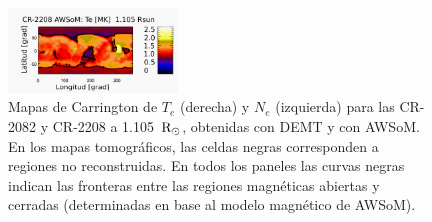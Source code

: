 \documentclass[baaa]{baaa}
\begin{document}
\begin{figure}[h!]
  \includegraphics[width=0.4\textwidth]{map_Te_awsom_2208_185_short_1105_Rsun_3.pdf}
  \caption{Mapas de Carrington de $T_e$ (derecha) y $N_e$ (izquierda) para las CR-2082 y CR-2208 a 1.105~${\rm 
  R_\odot}$, obtenidas con DEMT y con AWSoM. En los mapas tomográficos, las celdas negras corresponden a regiones no 
  reconstruidas. En todos los paneles las curvas negras indican las fronteras entre las regiones magnéticas abiertas y 
  cerradas (determinadas en base al modelo magnético de AWSoM).}
  \label{fig-carrington}
\end{figure}
\end{document}
